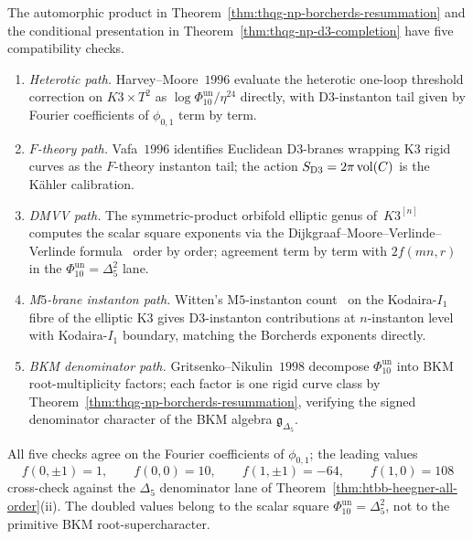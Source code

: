 \begin{remark}
\label{rem:thqg-np-multipath}
The automorphic product in Theorem~\ref{thm:thqg-np-borcherds-resummation}
and the conditional presentation in
Theorem~\ref{thm:thqg-np-d3-completion} have five compatibility
checks.
\begin{enumerate}[leftmargin=1.8em,label=\textup{(\alph*)}]
\item \emph{Heterotic path.} Harvey--Moore~$1996$
\cite[\S 4]{HarveyMoore1996} evaluate the heterotic one-loop
threshold correction on $K3\times T^2$ as $\log\Phi_{10}^{\mathrm{un}}/\eta^{24}$
directly, with D$3$-instanton tail given by Fourier coefficients of
$\phi_{0,1}$ term by term.
\item \emph{$F$-theory path.} Vafa~$1996$
\cite[\S 2]{VafaFTheory1996} identifies Euclidean D$3$-branes wrapping
K$3$ rigid curves as the $F$-theory instanton tail; the action
$S_{\mathrm{D3}} = 2\pi\operatorname{vol}(C)$ is the K\"ahler calibration.
\item \emph{DMVV path.} The symmetric-product orbifold elliptic genus
of~$K3^{[n]}$ computes the scalar square exponents via the
Dijkgraaf--Moore--Verlinde--Verlinde
formula~\cite{DMVV1997} order by order; agreement term by term with
$2f(mn,r)$ in the $\Phi_{10}^{\mathrm{un}}=\Delta_5^2$ lane.
\item \emph{M$5$-brane instanton path.} Witten's M$5$-instanton
count~\cite[\S 5]{Witten1996M5} on the Kodaira-$I_1$ fibre of the
elliptic K$3$ gives D$3$-instanton contributions at $n$-instanton
level with Kodaira-$I_1$ boundary, matching the Borcherds exponents
directly.
\item \emph{BKM denominator path.} Gritsenko--Nikulin~$1998$
\cite[Thm.~2.1]{GritsenkoNikulin1998} decompose $\Phi_{10}^{\mathrm{un}}$ into BKM
root-multiplicity factors; each factor is one rigid curve class by
Theorem~\ref{thm:thqg-np-borcherds-resummation}, verifying the
signed denominator character of the BKM algebra $\mathfrak{g}_{\Delta_5}$.
\end{enumerate}
All five checks agree on the Fourier coefficients of $\phi_{0,1}$; the
leading values
\[
 f(0,\pm1)=1,\qquad f(0,0)=10,\qquad
 f(1,\pm1)=-64,\qquad f(1,0)=108
\]
cross-check against the $\Delta_5$ denominator lane of
Theorem~\ref{thm:htbb-heegner-all-order}(ii).  The doubled values
belong to the scalar square
$\Phi_{10}^{\mathrm{un}}=\Delta_5^2$, not to the primitive
BKM root-supercharacter.
\end{remark}

